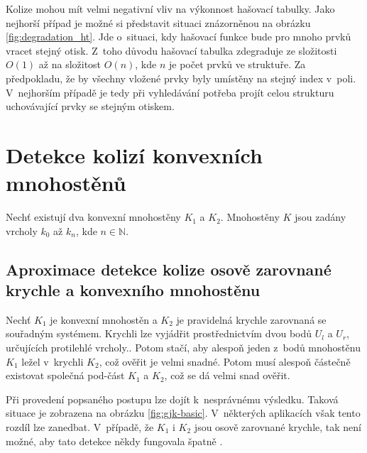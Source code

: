 Kolize mohou mít velmi negativní vliv na výkonnost hašovací tabulky. Jako nejhorší případ je možné si představit situaci znázorněnou na obrázku \ref{fig:degradation_ht}. Jde o~situaci, kdy hašovací funkce bude pro mnoho prvků vracet stejný otisk. Z~toho důvodu hašovací tabulka zdegraduje ze složitosti $O(1)$ až na složitost $O(n)$, kde $n$ je počet prvků ve struktuře. Za předpokladu, že by všechny vložené prvky byly umístěny na stejný index v~poli. V~nejhorším případě je tedy při vyhledávání potřeba projít celou strukturu uchovávající prvky se stejným otiskem. 

 
\section{Detekce kolizí konvexních mnohostěnů}
Nechť existují dva konvexní mnohostěny \(K_1\) a \(K_2\). Mnohostěny \(K\) jsou zadány vrcholy \(k_0\) až \(k_n\), kde \(n \in \mathbb{N}\). 

\subsection*{Aproximace detekce kolize osově zarovnané krychle a konvexního mnohostěnu}
Nechť \(K_1\) je konvexní mnohostěn a $K_2$ je pravidelná krychle zarovnaná se souřadným systémem. Krychli lze vyjádřit prostřednictvím dvou bodů \(U_l\) a \(U_r\), určujících protilehlé vrcholy.. Potom stačí, aby alespoň jeden z~bodů mnohostěnu \(K_1\) ležel v~krychli \(K_2\), což ověřit je velmi snadné. Potom musí alespoň částečně existovat společná pod-část \(K_1\) a \(K_2\), což se dá velmi snad ověřit.

Při provedení popsaného postupu lze dojít k~nesprávnému výsledku. Taková situace je zobrazena na obrázku \ref{fig:gjk-basic}. V~některých aplikacích však tento rozdíl lze zanedbat. V~případě, že $K_1$ i $K_2$ jsou osově zarovnané krychle, tak není možné, aby tato detekce někdy fungovala špatně \cite{3D_colision_survey}.


